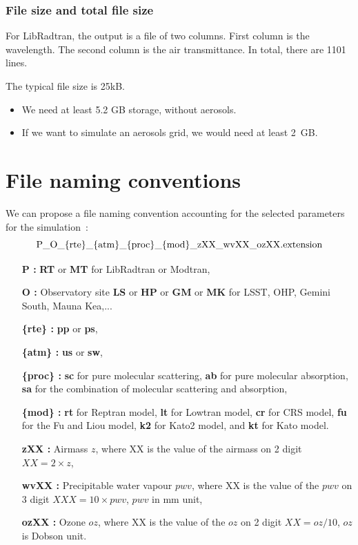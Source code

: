 \documentclass[a4paper]{article}
\begin{document}
\subsubsection{File size and total file size}
For LibRadtran, the output is a file of two columns. First column is the wavelength. The second column is the air transmittance.
In total, there are 1101 lines.

The typical file size is 25kB.

\begin{itemize}
\item We need at least 5.2  GB storage, without aerosols. 
\item If we want to simulate an aerosols grid, we would need at least 2~GB.
\end{itemize}

\section{File naming conventions}

We can propose a file naming convention accounting for the selected parameters for the simulation~:
\begin{equation}
{\rm  P\_O\_\{rte\}\_\{atm\}\_\{proc\}\_\{mod\}\_zXX\_wvXX\_ozXX.extension  }\nonumber
\end{equation}

\begin{itemize}
\item [{\bf P :} ] {\bf RT} or {\bf MT} for LibRadtran or Modtran,
\item [{\bf O :} ]  Observatory site {\bf LS} or {\bf HP}  or {\bf GM}  or {\bf MK} for LSST, OHP, Gemini South, Mauna Kea,...
\item [{\bf \{rte\} :}] {\bf pp} or  {\bf ps},
\item [{\bf \{atm\} :}]  {\bf us} or {\bf sw},
\item [{\bf \{proc\} :}] {\bf sc} for pure molecular scattering, {\bf ab} for pure molecular absorption, {\bf sa} for the combination of molecular scattering and absorption,
\item [{\bf \{mod\} :}] {\bf rt} for Reptran model, {\bf lt} for Lowtran model, {\bf cr} for CRS model,  {\bf fu} for the Fu and Liou model, {\bf k2} for Kato2 model, and {\bf kt} for Kato model.
\item [{\bf zXX :} ] Airmass $z$, where XX is the value of the airmass on 2 digit $XX=2\times z$,
\item [{\bf wvXX :} ] Precipitable water vapour $pwv$, where XX is the value of the $pwv$ on 3 digit $XXX=10\times pwv$, $pwv$ in mm unit,
\item [{\bf ozXX :} ] Ozone $oz$, where XX is the value of the $oz$ on 2 digit $XX=oz/10$, $oz$ is Dobson unit.
\end{itemize}
\end{document}
